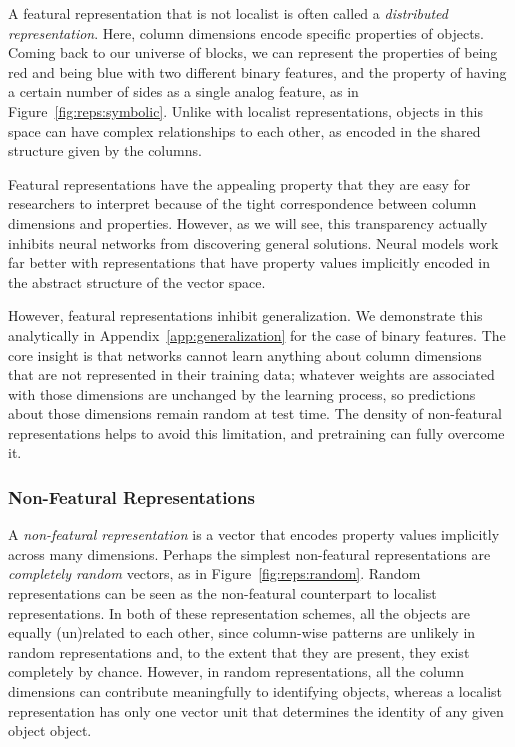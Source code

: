 \documentclass[9pt,twocolumn,twoside,lineno]{pnas-new}
\newcommand{\figref}[1]{Figure~\ref{#1}}
\newcommand{\appref}[1]{Appendix~\ref{#1}}
\newcommand{\tech}[1]{\emph{#1}}
\begin{document}
A featural representation that is not localist is often called a \tech{distributed representation}. Here, column dimensions encode specific properties of objects. Coming back to our universe of blocks, we can represent the properties of being red and being blue with two different binary features, and the property of having a certain number of sides as a single analog feature, as in \figref{fig:reps:symbolic}. Unlike with localist representations, objects in this space can have complex relationships to each other, as encoded in the shared structure given by the columns.

Featural representations have the appealing property that they are easy for researchers to interpret because of the tight correspondence between column dimensions and properties. However, as we will see, this transparency actually inhibits neural networks from discovering general solutions. Neural models work far better with representations that have property values implicitly encoded in the abstract structure of the vector space.

However, featural representations inhibit generalization. We demonstrate this analytically in \appref{app:generalization} for the case of binary features. The core insight is that networks cannot learn anything about column dimensions that are not represented in their training data; whatever weights are associated with those dimensions are unchanged by the learning process, so predictions about those dimensions remain random at test time. The density of non-featural representations helps to avoid this limitation, and pretraining can fully overcome it.

\subsubsection*{Non-Featural Representations}

A \tech{non-featural representation} is a vector that encodes property values implicitly across many dimensions. Perhaps the simplest non-featural representations are \tech{completely random} vectors, as in \figref{fig:reps:random}. Random representations can be seen as the non-featural counterpart to localist representations. In both of these representation schemes, all the objects are equally (un)related to each other, since column-wise patterns are unlikely in random representations and, to the extent that they are present, they exist completely by chance. However, in random representations, all the column dimensions can contribute meaningfully to identifying objects, whereas a localist representation has only one vector unit that determines the identity of any given object object.
\end{document}
